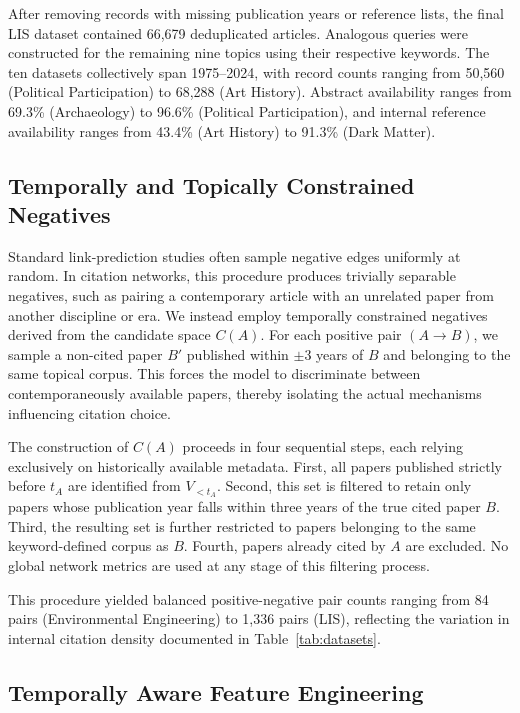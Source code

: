 \documentclass[11pt,a4paper]{article}
\begin{document}
After removing records with missing publication years or reference lists, the final LIS dataset contained 66,679 deduplicated articles. Analogous queries were constructed for the remaining nine topics using their respective keywords. The ten datasets collectively span 1975--2024, with record counts ranging from 50,560 (Political Participation) to 68,288 (Art History). Abstract availability ranges from 69.3\% (Archaeology) to 96.6\% (Political Participation), and internal reference availability ranges from 43.4\% (Art History) to 91.3\% (Dark Matter).

\subsection{Temporally and Topically Constrained Negatives}

Standard link-prediction studies often sample negative edges uniformly at random. In citation networks, this procedure produces trivially separable negatives, such as pairing a contemporary article with an unrelated paper from another discipline or era. We instead employ temporally constrained negatives derived from the candidate space \(C(A)\). For each positive pair $(A \to B)$, we sample a non-cited paper $B'$ published within $\pm 3$ years of $B$ and belonging to the same topical corpus. This forces the model to discriminate between contemporaneously available papers, thereby isolating the actual mechanisms influencing citation choice.

The construction of $C(A)$ proceeds in four sequential steps, each relying exclusively on historically available metadata. First, all papers published strictly before $t_A$ are identified from $V_{<t_A}$. Second, this set is filtered to retain only papers whose publication year falls within three years of the true cited paper $B$. Third, the resulting set is further restricted to papers belonging to the same keyword-defined corpus as $B$. Fourth, papers already cited by $A$ are excluded. No global network metrics are used at any stage of this filtering process.

This procedure yielded balanced positive-negative pair counts ranging from 84 pairs (Environmental Engineering) to 1,336 pairs (LIS), reflecting the variation in internal citation density documented in Table~\ref{tab:datasets}.

\subsection{Temporally Aware Feature Engineering}
\end{document}
